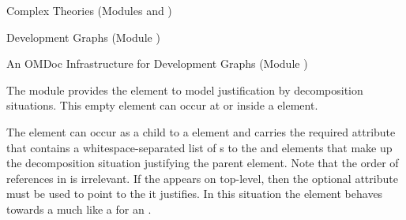 \begin{tchapter}[id=complex-theories,short=Complex Theories]{Complex Theories (Modules
    {} and {})}
\begin{tsection}[id=development-graphs,short=Development Graphs]{Development Graphs
    (Module {})}
\begin{tsubsection}[id=dg-omdoc,short=OMDoc Development Graphs]{An OMDoc Infrastructure
    for Development Graphs (Module {})}
  
  The {} module provides the {} element to model
  justification by decomposition situations.  This empty element can occur at
  {} or inside a {} element.
 
  The {} element can occur as a child to a
  {} element and carries the required attribute
  {} that contains a whitespace-separated list of
  {s} to the {} and {}
  elements that make up the decomposition situation justifying the parent
  {} element. Note that the order of references in
  {} is irrelevant. If the {}
  appears on top-level, then the optional {} attribute must
  be used to point to the {} it justifies. In this situation the
  {} element behaves towards a {} much
  like a {} for an {}.


\end{tsubsection}
\end{tsection}
\end{tchapter}

